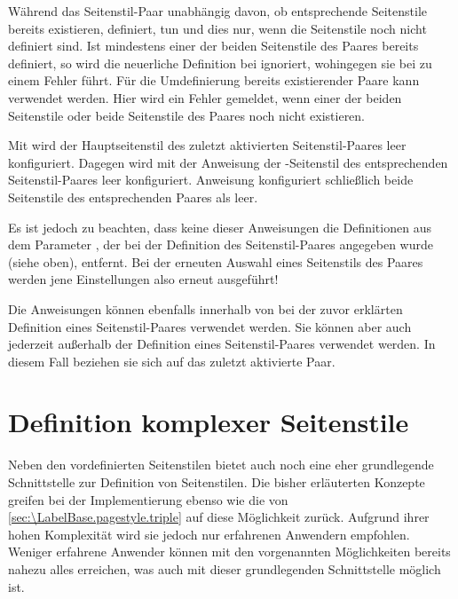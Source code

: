 Während  das Seitenstil-Paar
unabhängig davon, ob entsprechende Seitenstile bereits existieren, definiert,
tun  und  dies nur,
wenn die Seitenstile noch nicht definiert sind. Ist mindestens einer der
beiden Seitenstile des Paares bereits definiert, so wird die neuerliche
Definition bei  ignoriert, wohingegen sie bei
 zu einem Fehler führt. Für die Umdefinierung
bereits existierender Paare kann  verwendet
werden. Hier wird ein Fehler gemeldet, wenn einer der beiden Seitenstile oder
beide Seitenstile des Paares noch nicht existieren.%
\EndIndexGroup


\begin{Declaration}
\end{Declaration}
Mit  wird der Hauptseitenstil
des zuletzt aktivierten Seitenstil-Paares leer konfiguriert. Dagegen wird mit
der Anweisung  der
-Seitenstil des entsprechenden Seitenstil-Paares leer
konfiguriert. Anweisung  konfiguriert schließlich
beide Seitenstile des entsprechenden Paares als leer.

Es ist jedoch zu beachten, dass keine dieser Anweisungen
die Definitionen aus dem Parameter , der bei der Definition
des Seitenstil-Paares angegeben wurde (siehe oben), entfernt. Bei der erneuten
Auswahl eines Seitenstils des Paares werden jene Einstellungen also erneut
ausgeführt!

Die Anweisungen können ebenfalls innerhalb von  bei der
zuvor erklärten Definition eines Seitenstil-Paares verwendet werden. Sie
können aber auch jederzeit außerhalb der Definition eines Seitenstil-Paares
verwendet werden. In diesem Fall beziehen sie sich auf das zuletzt aktivierte
Paar.%
\EndIndexGroup


\section{Definition komplexer Seitenstile}

Neben den vordefinierten Seitenstilen bietet  auch
noch eine eher grundlegende Schnittstelle zur Definition von Seitenstilen. Die
bisher erläuterten Konzepte greifen bei der Implementierung ebenso wie die von
\autoref{sec:\LabelBase.pagestyle.triple} auf diese Möglichkeit
zurück. Aufgrund ihrer hohen Komplexität wird sie jedoch nur erfahrenen
Anwendern empfohlen. Weniger erfahrene Anwender können mit den vorgenannten
Möglichkeiten bereits nahezu alles erreichen, was auch mit dieser
grundlegenden Schnittstelle möglich ist.

